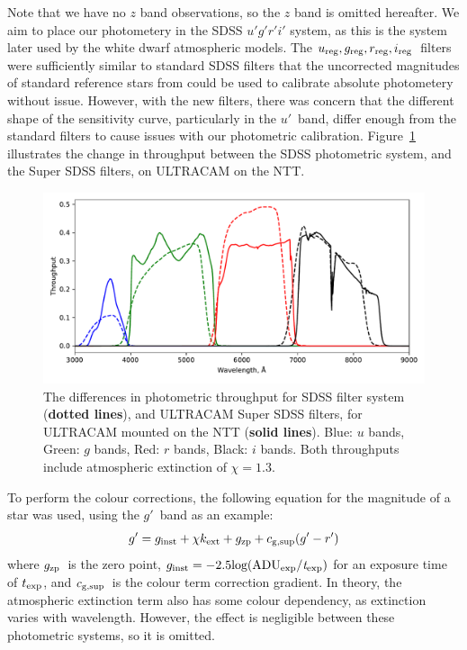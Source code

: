 Note that we have no $z$ band observations, so the $z$ band is omitted hereafter.
We aim to place our photometery in the SDSS $u'g'r'i'$ system, as this is the system later used by the white dwarf atmospheric models. The $u_{\rm reg}, g_{\rm reg}, r_{\rm reg}, i_{\rm reg}$\ filters were sufficiently similar to standard SDSS filters that the uncorrected magnitudes of standard reference stars from \citet{smith2002} could be used to calibrate absolute photometery without issue. However, with the new filters, there was concern that the different shape of the sensitivity curve, particularly in the $u'$\ band, differ enough from the standard filters to cause issues with our photometric calibration. Figure~\ref{fig:sdss vs super filters} illustrates the change in throughput between the SDSS photometric system, and the Super SDSS filters, on ULTRACAM on the NTT.
\begin{figure}
    \centering
    \includegraphics[width=\columnwidth]{figures/three_cvs_with_weird_colours/GeneralFigs/bandpass_diffs_SDSS_dots_UCAMNTT_solid.pdf}
    \caption{The differences in photometric throughput for SDSS filter system ({\bf dotted lines}), and ULTRACAM Super SDSS filters, for ULTRACAM mounted on the NTT ({\bf solid lines}). Blue: $u$ bands, Green: $g$ bands, Red: $r$ bands, Black: $i$ bands. Both throughputs include atmospheric extinction of $\chi = 1.3$.}
    \label{fig:sdss vs super filters}
\end{figure}

To perform the colour corrections, the following equation for the magnitude of a star was used, using the $g'$\ band as an example:
\begin{equation}
    \label{eqn:gen magnitudes}
    g' = g_{\rm inst} + \chi k_{\rm ext} + g_{\rm zp} + c_{\rm g, sup}(g'-r')
\end{equation}
where $g_{\rm zp}$\ is the zero point, $g_{\rm inst} = -2.5 \rm log(ADU_{\rm exp}/{\it t}_{\rm exp})$
for an exposure time of $t_{\rm exp}$, and $c_{\rm g, sup}$\ is the colour term correction gradient. In theory, the atmospheric extinction term also has some colour dependency, as extinction varies with wavelength. However, the effect is negligible between these photometric systems, so it is omitted.

